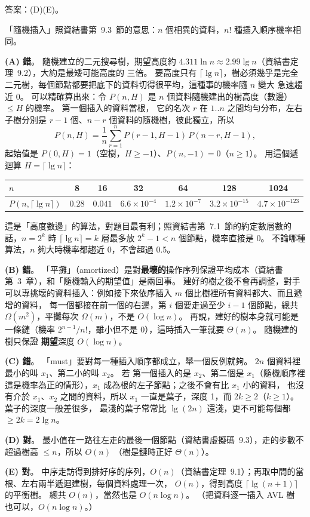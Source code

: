 \begin{pastsoln}
答案：(D)(E)。

「隨機插入」照資結書第~9.3~節的意思：$n$ 個相異的資料，$n!$ 種插入順序機率相同。

\textbf{(A) 錯}。 隨機建立的二元搜尋樹，期望高度約 $4.311 \ln n \approx 2.99 \lg n$（資結書定理~9.2），大約是最矮可能高度的
三倍。 要高度只有 $\lceil \lg n \rceil$，樹必須幾乎是完全二元樹，每個節點都要把底下的資料切得很平均，這種事的機率隨 $n$ 變大
急速趨近 0。 可以精確算出來：令 $P(n, H)$ 是 $n$ 個資料隨機建出的樹高度（數邊）$\le H$ 的機率。 第一個插入的資料當根，
它的名次 $r$ 在 $1..n$ 之間均勻分布，左右子樹分別是 $r - 1$ 個、$n - r$ 個資料的隨機樹，彼此獨立，所以
\[
P(n, H) = \frac{1}{n} \sum_{r=1}^{n} P(r - 1, H - 1)\, P(n - r, H - 1),
\]
起始值是 $P(0, H) = 1$（空樹，$H \ge -1$）、$P(n, -1) = 0$（$n \ge 1$）。
用這個遞迴算 $H = \lceil \lg n \rceil$：
\begin{center}
\small
\begin{tabular}{l*{6}{c}}
\toprule
$n$ & 8 & 16 & 32 & 64 & 128 & 1024 \\
\midrule
$P(n, \lceil \lg n \rceil)$ & $0.28$ & $0.041$ & $6.6 \times 10^{-4}$ & $1.2 \times 10^{-7}$ & $3.2 \times 10^{-15}$ & $4.7 \times 10^{-123}$ \\
\bottomrule
\end{tabular}
\end{center}
這是「高度數邊」的算法，對題目最有利；照資結書第~7.1~節的約定數層數的話，$n = 2^k$ 時 $\lceil \lg n \rceil = k$ 層最多放
$2^k - 1 < n$ 個節點，機率直接是 0。 不論哪種算法，$n$ 夠大時機率都趨近 0，不會超過 0.5。

\textbf{(B) 錯}。 「平攤」（amortized）是對\textbf{最壞的}操作序列保證平均成本（資結書第~3~章），和「隨機輸入的期望值」是兩回事。
建好的樹之後不會再調整，對手可以專挑壞的資料插入：例如接下來依序插入 $m$ 個比樹裡所有資料都大、而且遞增的資料，
每一個都接在前一個的右邊，第 $i$ 個要走過至少 $i - 1$ 個節點，總共 $\Omega(m^2)$，平攤每次 $\Omega(m)$，不是 $O(\log n)$。
再說，建好的樹本身就可能是一條鏈（機率 $2^{n-1}/n!$，雖小但不是 0），這時插入一筆就要 $\Theta(n)$。 隨機建的樹只保證
\textbf{期望}深度 $O(\log n)$。

\textbf{(C) 錯}。 「must」要對每一種插入順序都成立，舉一個反例就夠。 $2n$ 個資料裡最小的叫 $x_1$、第二小的叫 $x_2$。 若
第一個插入的是 $x_2$、第二個是 $x_1$（隨機順序裡這是機率為正的情形），$x_1$ 成為根的左子節點；之後不會有比 $x_1$ 小的資料，
也沒有介於 $x_1$、$x_2$ 之間的資料，所以 $x_1$ 一直是葉子，深度 1，而 $2k \ge 2$（$k \ge 1$）。 葉子的深度一般差很多，
最淺的葉子常常比 $\lg(2n)$ 還淺，更不可能每個都 $\ge 2k = 2\lg n$。

\textbf{(D) 對}。 最小值在一路往左走的最後一個節點（資結書虛擬碼~9.3），走的步數不超過樹高 $\le n$，所以 $O(n)$
（樹是鏈時正好 $\Theta(n)$）。

\textbf{(E) 對}。 中序走訪得到排好序的序列，$O(n)$（資結書定理~9.1）；再取中間的當根、左右兩半遞迴建樹，每個資料處理一次，
$O(n)$，得到高度 $\lceil \lg(n + 1) \rceil$ 的平衡樹。 總共 $O(n)$，當然也是 $O(n \log n)$。 （把資料逐一插入 AVL 樹
也可以，$O(n \log n)$。）
\end{pastsoln}
